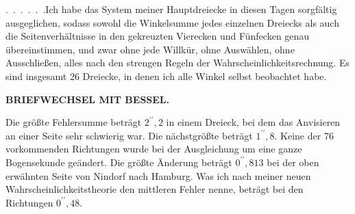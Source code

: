 \par\noindent\hspace*{\parindent}.\ .\ .\ .\ .\ .\quad Ich habe das System meiner Hauptdreiecke in diesen Tagen sorgfältig ausgeglichen, sodass sowohl die Winkelsumme jedes einzelnen Dreiecks als auch die Seitenverhältnisse in den gekreuzten Vierecken und Fünfecken genau übereinstimmen, und zwar ohne jede Willkür, ohne Auswählen, ohne Ausschließen, alles nach den strengen Regeln der Wahrscheinlichkeitsrechnung.
Es sind insgesamt 26 Dreiecke, in denen ich alle Winkel selbst beobachtet habe.
\par\clearpage
{}\hfill{\small\textbf{BRIEFWECHSEL MIT BESSEL.}}\par\medskip
\noindent Die größte Fehlersumme beträgt \(2^{\prime\prime}{,}2\) in einem Dreieck, bei dem das Anvisieren an einer Seite sehr schwierig war. Die nächstgrößte beträgt \(1^{\prime\prime}{,}8\).
Keine der 76 vorkommenden Richtungen wurde bei der Ausgleichung um eine ganze Bogensekunde geändert. Die größte Änderung beträgt \(0^{\prime\prime}{,}813\) bei der oben erwähnten Seite von Nindorf nach Hamburg.
Was ich nach meiner neuen Wahrscheinlichkeitstheorie den mittleren Fehler nenne, beträgt bei den Richtungen \(0^{\prime\prime}{,}48\).
\par\endgroup

